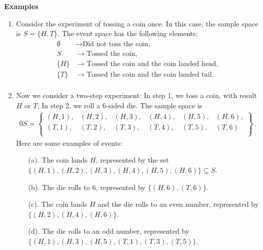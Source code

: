 \documentclass[11pt,oneside]{book}
\theoremstyle{newStyle}
\newcommand*{\dr}[5]{\draw ({#1}.east) --+ ({#4},{#5}) node[right] ({#2}) {{#3}};}
\begin{document}
\begin{enumerate}
\end{enumerate}


\vspace{2cm}

\textbf{Examples}
\begin{enumerate}
\item
Consider the experiment of tossing a coin once. In this case, the sample space is $S = \{H, T\}$. The event space has the following elements:
\begin{align*}
\emptyset\ \ &\rightarrow \text{Did not toss the coin,}\\
S\ \ &\rightarrow \text{Tossed the coin},\\
\{H\} &\rightarrow\text{Tossed the coin and the coin landed head},\\
\{T\} &\rightarrow\text{Tossed the coin and the coin landed tail}.\\
\end{align*}

\item Now we consider a two-step experiment: In step 1, we toss a coin, with result $H$ or $T$; In step 2, we roll a 6-sided die. The sample space is 
\begin{align*}0
S = \left\{
\begin{matrix}
(H,1), &(H,2), &(H,3),& (H,4),& (H,5),& (H,6), \\
(T,1),& (T,2), &(T,3), &(T,4),& (T,5), &(T,6) \\
\end{matrix}
\right\}\ .
\end{align*}
Here are some examples of events:
\begin{enumerate}
\item[(a).] The coin lands $H$, represented by the set $\{(H,1), (H,2), (H,3), (H,4), (H,5), (H,6) \} \subseteq S$.
\item[(b).] The die rolls to $6$, represented by $\{(H,6), (T,6)\}$. 
\item[(c).] The coin lands $H$ and the die rolls to an even number, represented by $\{(H,2), (H,4), (H,6)\}$.
\item[(d).] The die rolls to an odd number, represented by $\{(H,1), (H,3), (H,5), (T,1), (T,3), (T,5)\}$.
\end{enumerate}
\end{enumerate}
\end{document}
